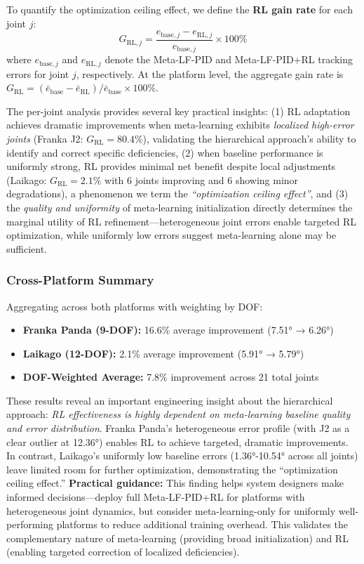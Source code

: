 \documentclass[DTMColor]{ROB-New}
\begin{document}
{\color{blue}To quantify the optimization ceiling effect, we define the \textbf{RL gain rate} for each joint $j$:
\begin{equation}
    G_{\mathrm{RL},j} = \frac{e_{\mathrm{base},j} - e_{\mathrm{RL},j}}{e_{\mathrm{base},j}} \times 100\%
    \label{eq:grl}
\end{equation}
where $e_{\mathrm{base},j}$ and $e_{\mathrm{RL},j}$ denote the Meta-LF-PID and Meta-LF-PID+RL tracking errors for joint $j$, respectively. At the platform level, the aggregate gain rate is $G_{\mathrm{RL}} = (\bar{e}_{\mathrm{base}} - \bar{e}_{\mathrm{RL}}) / \bar{e}_{\mathrm{base}} \times 100\%$.}

The per-joint analysis provides several key practical insights: (1) RL adaptation achieves dramatic improvements when meta-learning exhibits \textit{localized high-error joints} (Franka J2: $G_{\mathrm{RL}}=80.4\%$), validating the hierarchical approach's ability to identify and correct specific deficiencies, (2) when baseline performance is uniformly strong, RL provides minimal net benefit despite local adjustments (Laikago: $G_{\mathrm{RL}}=2.1\%$ with 6 joints improving and 6 showing minor degradations), a phenomenon we term the \textit{``optimization ceiling effect''}, and (3) the \textit{quality and uniformity} of meta-learning initialization directly determines the marginal utility of RL refinement---heterogeneous joint errors enable targeted RL optimization, while uniformly low errors suggest meta-learning alone may be sufficient.

\subsubsection{Cross-Platform Summary}

Aggregating across both platforms with weighting by DOF:
\begin{itemize}
    \item \textbf{Franka Panda (9-DOF):} 16.6\% average improvement (7.51° → 6.26°)
    \item \textbf{Laikago (12-DOF):} 2.1\% average improvement (5.91° → 5.79°)
    \item \textbf{DOF-Weighted Average:} 7.8\% improvement across 21 total joints
\end{itemize}

These results reveal an important engineering insight about the hierarchical approach: \textit{RL effectiveness is highly dependent on meta-learning baseline quality and error distribution}. Franka Panda's heterogeneous error profile (with J2 as a clear outlier at 12.36°) enables RL to achieve targeted, dramatic improvements. In contrast, Laikago's uniformly low baseline errors (1.36°-10.54° across all joints) leave limited room for further optimization, demonstrating the ``optimization ceiling effect.'' \textbf{Practical guidance:} This finding helps system designers make informed decisions—deploy full Meta-LF-PID+RL for platforms with heterogeneous joint dynamics, but consider meta-learning-only for uniformly well-performing platforms to reduce additional training overhead. This validates the complementary nature of meta-learning (providing broad initialization) and RL (enabling targeted correction of localized deficiencies).
\end{document}
